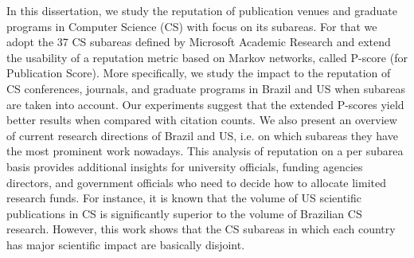 
In this dissertation, we study the reputation of publication venues and graduate programs in Computer Science (CS) with focus on its subareas. For that we adopt the 37 CS subareas defined by Microsoft Academic Research and extend the usability of a reputation metric based on Markov networks, called P-score (for Publication Score).
%
More specifically, we study the impact to the reputation of CS conferences, journals, and graduate programs in Brazil and US when subareas are taken into account. 
%
Our experiments suggest that the extended P-scores yield better results when compared with citation counts. We also present an overview of current research directions of Brazil and US, i.e. on which subareas they have the most prominent work nowadays. 
%
This analysis of reputation on a per subarea basis provides additional insights for university officials, funding agencies directors, and government officials who need to decide how to allocate limited research funds. For instance, it is known that the volume of US scientific publications in CS is significantly superior to the volume of Brazilian CS research. However, this work shows that the CS subareas in which each country has major scientific impact are basically disjoint. 




